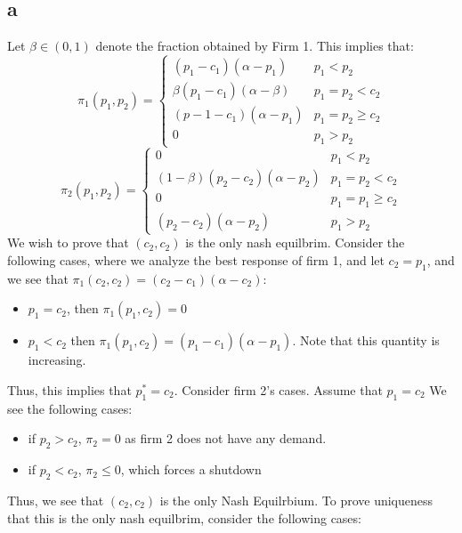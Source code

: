 \documentclass[11pt]{article}
\begin{document}
\subsection*{a}
Let $\beta \in (0,1)$ denote the fraction obtained by Firm 1.
This implies that:
\[
\pi_1(p_1, p_2) = \begin{cases}
    (p_1 - c_1)(\alpha - p_1) & p_1 < p_2\\
    \beta(p_1 - c_1)(\alpha - \beta) & p_1 = p_2 < c_2\\
    (p-1 - c_1)(\alpha - p_1) & p_1 = p_2 \geq c_2\\
    0 & p_1 > p_2
\end{cases}
\]
\[
    \pi_2(p_1, p_2) = \begin{cases}
        0 & p_1 < p_2\\
        (1-\beta)(p_2-c_2)(\alpha - p_2) & p_1 = p_2 < c_2\\
        0 & p_1 = p_1 \geq c_2\\
        (p_2 - c_2)(\alpha - p_2) & p_1 > p_2 
    \end{cases}
\]
We wish to prove that $(c_2, c_2)$ is the only nash equilbrim. Consider the following cases, where we analyze the best response of firm 1, and let $c_2 = p_1$, and we see that $\pi_1(c_2, c_2) = (c_2 - c_1)(\alpha - c_2)$:
\begin{itemize}
    \item $p_1 = c_2$, then $\pi_1(p_1, c_2) = 0$
    \item $p_1 < c_2$ then $\pi_1(p_1, c_2) = (p_1 - c_1)(\alpha - p_1)$. Note that this quantity is increasing.
\end{itemize}
Thus, this implies that $p_1^* = c_2$. Consider firm 2's cases. Assume that $p_1 = c_2$ We see the following cases:
\begin{itemize}
    \item if $p_2 > c_2$, $\pi_2 = 0$ as firm 2 does not have any demand. 
    \item if $p_2 < c_2$, $\pi_2 \leq 0$, which forces a shutdown
\end{itemize}
Thus, we see that $(c_2, c_2)$ is the only Nash Equilrbium. To prove uniqueness that this is the only nash equilbrim, consider the following cases:
\end{document}
